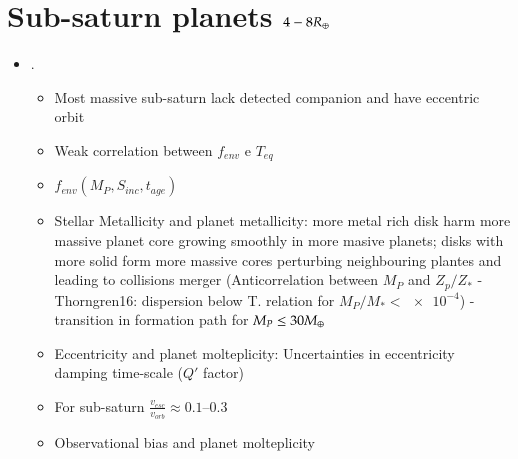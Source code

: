 \chapter{Sub-saturn planets $4-8R_{\oplus}{}$}
\begin{itemize}
    \item \cite{petigura2017four}.
    \begin{itemize}
        \item Most massive sub-saturn lack detected companion and have eccentric orbit
        \item Weak correlation between $f_{env}$ e $T_{eq}$
        \item $f_{env}(M_P,S_{inc},t_{age})$
        \item Stellar Metallicity and planet metallicity: more metal rich disk harm more massive planet core growing smoothly in more masive planets; disks with more solid form more massive cores perturbing neighbouring plantes and leading to collisions merger (Anticorrelation between $M_P$ and $Z_p/Z_*$ - Thorngren16: dispersion below T. relation for $M_P/M_*<\num{e-4}$) - transition in formation path for $M_P\leq30M_{\oplus}$
        \item Eccentricity and planet molteplicity: Uncertainties in eccentricity damping time-scale ($Q'$ factor)
        \item For sub-saturn $\frac{v_{esc}}{v_{orb}}\approx\numrange{0.1}{0.3}$
        \item Observational bias and planet molteplicity
    \end{itemize}
\end{itemize}